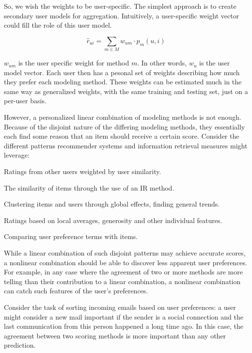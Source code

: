 So, we wish the weights to be user-specific. The simplest approach is to create secondary user models for aggregation.
Intuitively, a user-specific weight vector could fill the role of this user model.

\begin{equation*}
  \hat{r}_{ui} = \sum_{m \in M} w_{um} \cdot p_m(u,i)
\end{equation*}

$w_{um}$ is the user specific weight for method $m$. In other words, $w_{u}$ is the user model vector.
Each user then has a pesonal set of weights describing how much they prefer each modeling method.
These weights can be estimated much in the same way as generalized weights, 
with the same training and testing set, just on a per-user basis.

However, a personalized linear combination of modeling methods is not enough.
Because of the disjoint nature of the differing modeling methods, 
they essentially each find some reason that an item should receive a certain score.
Consider the different patterns recommender systems and information retrieval measures might leverage:

\begin{itemize*}
  \item Ratings from other users weighted by user similarity.
  \item The similarity of items through the use of an IR method.
  \item Clustering items and users through global effects, finding general trends.
  \item Ratings based on local averages, generosity and other individual features.
  \item Comparing user preference terms with items.
\end{itemize*}

While a linear combination of such disjoint patterns may achieve accurate scores,
a nonlinear combination should be able to discover less apparent user preferences.
For example, in any case where the agreement of two or more methods are more telling than their contribution
to a linear combination, a nonlinear combination can catch such features of the user's preferences.

Consider the task of sorting incoming emails based on user preferences: 
a user might consider a new mail important if the sender is a social connection
and the last communication from this person happened a long time ago. 
In this case, the agreement between two scoring methods is more important
than any other prediction.

